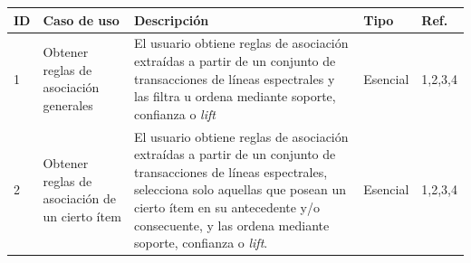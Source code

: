 \begin{tabular}{|l|p{4cm}|p{7cm}|l|l|}
	\hline
	ID & Caso de uso & Descripción & Tipo & Ref. \\ \hline
	1 & Obtener reglas de asociación generales & El usuario obtiene reglas de asociación extraídas a partir de un conjunto de transacciones de líneas espectrales y las filtra u ordena mediante soporte, confianza o \textit{lift} & Esencial & 1,2,3,4 \\ \hline
	2 & Obtener reglas de asociación de un cierto ítem & El usuario obtiene reglas de asociación extraídas a partir de un conjunto de transacciones de líneas espectrales, selecciona solo aquellas que posean un cierto ítem en su antecedente y/o consecuente, y las ordena mediante soporte, confianza o \textit{lift}. & Esencial & 1,2,3,4 \\ \hline
\end{tabular}
